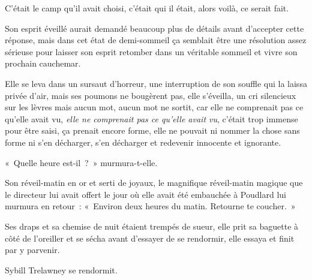 C'était le camp qu'il avait choisi, c'était qui il était, alors voilà, ce serait fait.

Son esprit éveillé aurait demandé beaucoup plus de détails avant d'accepter cette réponse, mais dans cet état de demi-sommeil ça semblait être une résolution assez sérieuse pour laisser son esprit retomber dans un véritable sommeil et vivre son prochain cauchemar.


Elle se leva dans un sursaut d'horreur, une interruption de son souffle qui la laissa privée d'air, mais ses poumons ne bougèrent pas, elle s'éveilla, un cri silencieux sur les lèvres mais aucun mot, aucun mot ne sortit, car elle ne comprenait pas ce qu'elle avait vu, \emph{elle ne comprenait pas ce qu'elle avait vu}, c'était trop immense pour être saisi, ça prenait encore forme, elle ne pouvait ni nommer la chose sans forme ni s'en décharger, s'en décharger et redevenir innocente et ignorante.

«~Quelle heure est-il~?~»
murmura-t-elle.

Son réveil-matin en or et serti de joyaux, le magnifique réveil-matin magique que le directeur lui avait offert le jour où elle avait été embauchée à Poudlard lui murmura en retour~: «~Environ deux heures du matin.
Retourne te coucher.~»

Ses draps et sa chemise de nuit étaient trempés de sueur, elle prit sa baguette à côté de l'oreiller et se sécha avant d'essayer de se rendormir, elle essaya et finit par y parvenir.

Sybill Trelawney se rendormit.
